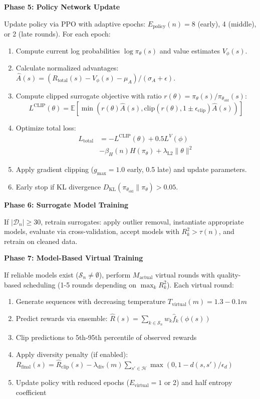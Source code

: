 \documentclass[conference]{IEEEtran}
\begin{document}
\textbf{Phase 5: Policy Network Update}

Update policy via PPO with adaptive epochs: $E_{\text{policy}}(n) = 8$ (early), 4 (middle), or 2 (late rounds). For each epoch:
\begin{enumerate}
    \item Compute current log probabilities $\log \pi_\theta(s)$ and value estimates $V_\phi(s)$.
    \item Calculate normalized advantages: $\hat{A}(s) = (R_{\text{total}}(s) - V_\phi(s) - \mu_A)/(\sigma_A + \epsilon)$.
    \item Compute clipped surrogate objective with ratio $r(\theta) = \pi_\theta(s)/\pi_{\theta_{\text{old}}}(s)$:
    \begin{equation}
    L^{\text{CLIP}}(\theta) = \mathbb{E}[\min(r(\theta)\hat{A}(s), \text{clip}(r(\theta), 1\pm\epsilon_{\text{clip}})\hat{A}(s))]
    \end{equation}
    \item Optimize total loss: 
    \begin{equation*}
    \begin{split}
    L_{\text{total}} &= -L^{\text{CLIP}}(\theta) + 0.5 L^V(\phi) \\
    &- \beta_H(n) H(\pi_\theta) + \lambda_{\text{L2}} \|\theta\|^2
    \end{split}
    \end{equation*}
    \item Apply gradient clipping ($g_{\max} = 1.0$ early, 0.5 late) and update parameters.
    \item Early stop if KL divergence $D_{\text{KL}}(\pi_{\theta_{\text{old}}} \| \pi_\theta) > 0.05$.
\end{enumerate}

\textbf{Phase 6: Surrogate Model Training}

If $|\mathcal{D}_n| \geq 30$, retrain surrogates: apply outlier removal, instantiate appropriate models, evaluate via cross-validation, accept models with $R^2_k > \tau(n)$, and retrain on cleaned data.

\textbf{Phase 7: Model-Based Virtual Training}

If reliable models exist ($\mathcal{S}_n \neq \emptyset$), perform $M_{\text{actual}}$ virtual rounds with quality-based scheduling (1-5 rounds depending on $\max_k R^2_k$). Each virtual round:
\begin{enumerate}
    \item Generate sequences with decreasing temperature $T_{\text{virtual}}(m) = 1.3 - 0.1m$
    \item Predict rewards via ensemble: $\hat{R}(s) = \sum_{k \in \mathcal{S}_n} w_k \hat{f}_k(\phi(s))$
    \item Clip predictions to 5th-95th percentile of observed rewards
    \item Apply diversity penalty (if enabled): $R_{\text{final}}(s) = \hat{R}_{\text{clip}}(s) - \lambda_{\text{div}}(m) \sum_{s' \in \mathcal{H}} \max(0, 1 - d(s, s')/\epsilon_d)$
    \item Update policy with reduced epochs ($E_{\text{virtual}} = 1$ or 2) and half entropy coefficient
\end{enumerate}
\end{document}
